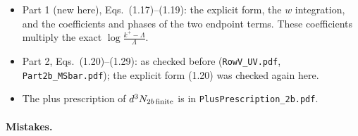 \documentclass[10pt]{article}
\numberwithin{equation}{section}
\begin{document}
\begin{itemize}
\begin{itemize}
\item Part 1 (new here), Eqs.~(1.17)--(1.19): the explicit form, the $w$ integration, and the coefficients and phases of the two endpoint terms. These coefficients multiply the exact $\log\frac{k^+-\Lambda}{\Lambda}$.
\item Part 2, Eqs.~(1.20)--(1.29): as checked before (\texttt{RowV\_UV.pdf}, \texttt{Part2b\_MSbar.pdf}); the explicit form (1.20) was checked again here.
\item The plus prescription of $d^3N_{2b\,\rm finite}$ is in \texttt{PlusPrescription\_2b.pdf}.
\end{itemize}
\end{itemize}

\paragraph{Mistakes.}
\end{document}
